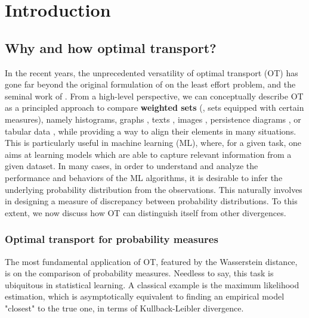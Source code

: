 \chapter[Introduction]{Introduction}


\renewcommand{\contentsname}{Contents}
\localtableofcontents*
{}


\section{Why and how optimal transport?}

In the recent years, the unprecedented versatility of optimal transport (OT) has gone far beyond
the original formulation of \citet{Monge81} on the least effort problem,
and the seminal work of \citet{Kanto42}. From a high-level perspective, we can
conceptually describe OT as a principled approach to compare \textbf{weighted sets}
(\ie, sets equipped with certain measures), namely histograms, graphs \citep{Nikolentzos17},
texts \citep{Kusner15}, images \citep{Arjovsky17}, persistence diagrams \citep{Edelsbrunner02},
or tabular data \citep{Redko20}, while providing a way to align their elements in
many situations. This is particularly useful in machine learning (ML), where, for a given task,
one aims at learning models which are able to capture relevant information from a given dataset.
In many cases, in order to understand and analyze the performance and behaviors of the ML algorithms,
it is desirable to infer the underlying probability distribution from the observations.
This naturally involves in designing a measure of discrepancy between probability distributions.
To this extent, we now discuss how OT can distinguish itself from other divergences.

\subsection{Optimal transport for probability measures}
The most fundamental application of OT, featured by the Wasserstein distance,
is on the comparison of probability measures. Needless to say,
this task is ubiquitous in statistical learning. A classical example is
the maximum likelihood estimation,
which is asymptotically equivalent to finding an empirical model "closest" to the true one,
in terms of Kullback-Leibler divergence.


